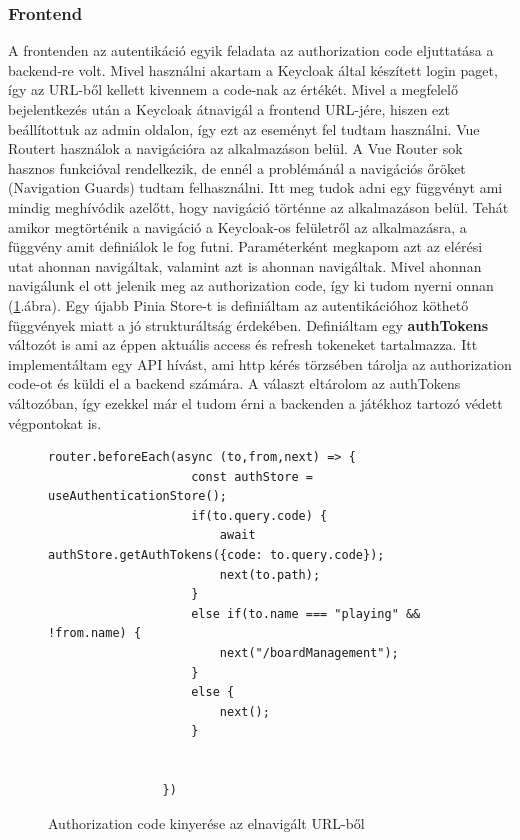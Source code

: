 \documentclass[a4paper,twoside]{article}
\begin{document}
\subsubsection{Frontend} \label{aut-frontend}
A frontenden az autentikáció egyik feladata az authorization code eljuttatása a backend-re volt. Mivel használni akartam a Keycloak által 
készített login paget, így az URL-ből kellett kivennem a code-nak az értékét. Mivel a megfelelő bejelentkezés után a Keycloak átnavigál a frontend 
URL-jére, hiszen ezt beállítottuk az admin oldalon, így ezt az eseményt fel tudtam használni. Vue Routert használok a navigációra az alkalmazáson belül. A Vue Router 
sok hasznos funkcióval rendelkezik, de ennél a problémánál a navigációs őröket (Navigation Guards) tudtam felhasználni. Itt meg tudok adni egy függvényt ami
mindig meghívódik azelőtt, hogy navigáció történne az alkalmazáson belül. Tehát amikor megtörténik a navigáció a Keycloak-os felületről az alkalmazásra, a függvény amit 
definiálok le fog futni. Paraméterként megkapom azt az elérési utat ahonnan navigáltak, valamint azt is ahonnan navigáltak. Mivel ahonnan navigálunk el ott jelenik meg az
authorization code, így ki tudom nyerni onnan (\ref{authCode}.ábra). Egy újabb Pinia Store-t is definiáltam az autentikációhoz köthető függvények miatt a jó strukturáltság érdekében. Definiáltam egy \textbf{authTokens} változót is ami az éppen aktuális access és refresh tokeneket tartalmazza. Itt implementáltam egy API hívást, ami http kérés törzsében tárolja az authorization code-ot és küldi el a backend számára. A választ eltárolom az authTokens változóban, így ezekkel már el tudom érni a backenden a játékhoz tartozó védett végpontokat is. 
\begin{figure}
	\caption{Authorization code kinyerése az elnavigált URL-ből}

		\begin{minipage}{\textwidth}
			\begin{lstlisting}[style=javascriptStyle]
				router.beforeEach(async (to,from,next) => {
					const authStore = useAuthenticationStore();
					if(to.query.code) {
						await authStore.getAuthTokens({code: to.query.code});
						next(to.path);
					}
					else if(to.name === "playing" && !from.name) {
						next("/boardManagement");
					}
					else {
						next();
					}
					
					
				})
			\end{lstlisting}
		\end{minipage}
	
	\label{authCode}
\end{figure}
\FloatBarrier
\end{document}
